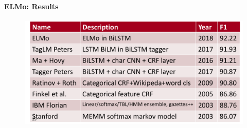 \paragraph{ELMo: Results}

    \begin{figure}[h]
        	\includegraphics[scale = 0.25]{pics/elmo_results.png}
        \end{figure}  

 

